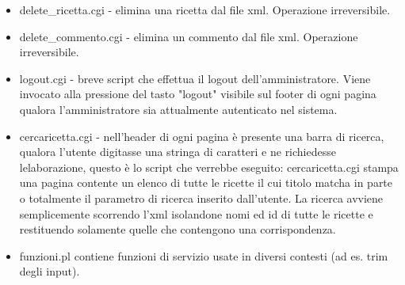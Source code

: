 \documentclass[12pt]{article}
\begin{document}
\begin{itemize}
				\item delete\_ricetta.cgi - elimina una ricetta dal file xml. Operazione irreversibile.

				
				\item delete\_commento.cgi - elimina un commento dal file xml. Operazione irreversibile.

				\item logout.cgi - breve script che effettua il logout dell'amministratore. Viene invocato alla pressione del tasto "logout" visibile sul footer di ogni pagina qualora l'amministratore sia attualmente autenticato nel sistema.

				\item cercaricetta.cgi - nell'header di ogni pagina è presente una barra di ricerca, qualora l'utente digitasse una stringa di caratteri e ne richiedesse lelaborazione, questo è lo script che verrebbe eseguito: cercaricetta.cgi stampa una pagina contente un elenco di tutte le ricette il cui titolo matcha in parte o totalmente il parametro di ricerca inserito dall'utente. La ricerca avviene semplicemente scorrendo l'xml isolandone nomi ed id di tutte le ricette e restituendo solamente quelle che contengono una corrispondenza.

				\item funzioni.pl  contiene funzioni di servizio usate in diversi contesti (ad es. trim degli input).	

\end{itemize}

	
		
	
	
\end{document}
